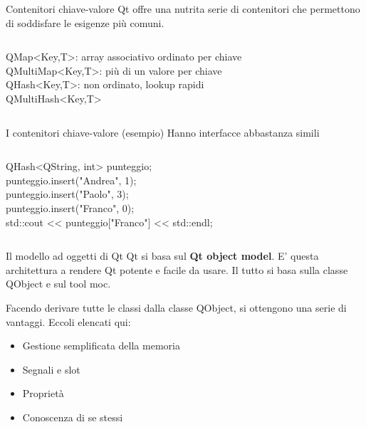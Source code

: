 \documentclass{beamer}
\begin{document}
\begin{frame}{Contenitori chiave-valore}
	Qt offre una nutrita serie di contenitori che permettono di soddisfare le esigenze più comuni.
	\bigskip
	\begin{columns}
		\begin{block}{}
			{\ttfamily QMap<Key,T>}: array associativo ordinato per chiave\\
			{\ttfamily QMultiMap<Key,T>}: più di un valore per chiave\\
			{\ttfamily QHash<Key,T>}: non ordinato, lookup rapidi\\
			{\ttfamily QMultiHash<Key,T>}
		\end{block}
	\end{columns}
\end{frame}

\begin{frame}{I contenitori chiave-valore (esempio)}
Hanno interfacce abbastanza simili
\bigskip
\begin{columns}
	\column{0.75\textwidth}
	\begin{block}{}
		{\ttfamily QHash<QString, int> punteggio;\\
			punteggio.insert("Andrea", 1);\\
			punteggio.insert("Paolo", 3);\\
			punteggio.insert("Franco", 0);\\
			std::cout << punteggio["Franco"] << std::endl;}
	\end{block}
\end{columns}
\end{frame}

\begin{frame}{Il modello ad oggetti di Qt}
	Qt si basa sul \textbf{Qt object model}. E' questa architettura a rendere Qt potente e facile da usare. Il tutto si basa sulla classe {\ttfamily QObject} e sul tool {\ttfamily moc}.
	
	Facendo derivare tutte le classi dalla classe {\ttfamily QObject}, si ottengono una serie di vantaggi. Eccoli elencati qui:
	
	\begin{itemize}
		\item Gestione semplificata della memoria
		\item Segnali e slot
		\item Proprietà
		\item Conoscenza di se stessi
	\end{itemize}
\end{frame}
\end{document}
